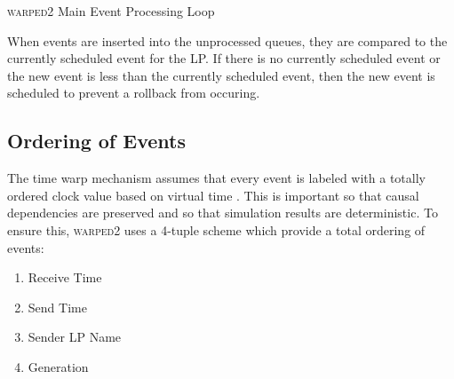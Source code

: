 \documentclass[11pt]{book}
\begin{document}
\begin{algorithm}
\DontPrintSemicolon
{}
\SetAlgoVlined


\caption{\textsc{warped2} Main Event Processing Loop}\label{warped2_processing}
\end{algorithm}

When events are inserted into the unprocessed queues, they are compared to the currently
scheduled event for the LP. If there is no currently scheduled event or the new event is less
than the currently scheduled event, then the new event is scheduled to prevent a rollback from
occuring.

\subsection{Ordering of Events}

The time warp mechanism assumes that every event is labeled with a totally ordered clock value
based on virtual time \cite{jefferson-85}. This is important so that causal dependencies
are preserved and so that simulation results are deterministic\cite{ronngren-99}. To ensure
this, \textsc{warped2} uses a 4-tuple scheme which provide a total ordering of events:

\begin{enumerate}
    \item Receive Time
    \item Send Time
    \item Sender LP Name
    \item Generation
\end{enumerate}
\end{document}
